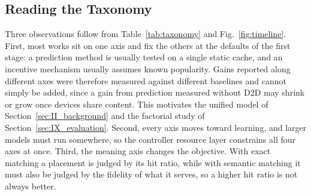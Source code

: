 \subsection{Reading the Taxonomy}
Three observations follow from Table~\ref{tab:taxonomy} and Fig.~\ref{fig:timeline}. First, most works sit on one axis and fix the others at the defaults of the first stage: a prediction method is usually tested on a single static cache, and an incentive mechanism usually assumes known popularity. Gains reported along different axes were therefore measured against different baselines and cannot simply be added, since a gain from prediction measured without D2D may shrink or grow once devices share content. This motivates the unified model of Section~\ref{sec:II_background} and the factorial study of Section~\ref{sec:IX_evaluation}. Second, every axis moves toward learning, and larger models must run somewhere, so the controller resource layer constrains all four axes at once. Third, the meaning axis changes the objective. With exact matching a placement is judged by its hit ratio, while with semantic matching it must also be judged by the fidelity of what it serves, so a higher hit ratio is not always better.
